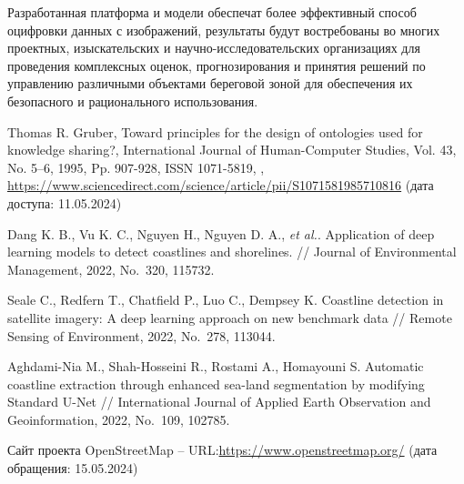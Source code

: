 \documentclass[732,14pt,final]{studrep}
\begin{document}
Разработанная платформа и модели обеспечат более эффективный способ оцифровки данных с изображений, результаты будут востребованы во многих проектных, изыскательских и научно-исследовательских организациях для проведения комплексных оценок, прогнозирования и принятия решений по управлению различными объектами береговой зоной для обеспечения их безопасного и рационального использования.


\begin{thebibliography}{99}
   Thomas R. Gruber,
Toward principles for the design of ontologies used for knowledge sharing?,
International Journal of Human-Computer Studies,
Vol. 43, No. 5–6,
1995,
Pp. 907-928,
ISSN 1071-5819,
, \url{https://www.sciencedirect.com/science/article/pii/S1071581985710816} (дата доступа: 11.05.2024)

 Dang K. B., Vu K. C., Nguyen H., Nguyen D. A., \emph{et al.}. Application of deep learning models to detect coastlines and shorelines. // Journal of Environmental Management, 2022, No.~320, 115732.

 Seale C., Redfern T., Chatfield P., Luo C., Dempsey K. Coastline detection in satellite imagery: A deep learning approach on new benchmark data // Remote Sensing of Environment, 2022, No.~278, 113044.

 Aghdami-Nia M., Shah-Hosseini R., Rostami A., Homayouni S. Automatic coastline extraction through enhanced sea-land segmentation by modifying Standard U-Net // International Journal of Applied Earth Observation and Geoinformation, 2022, No.~109, 102785.

 Сайт проекта OpenStreetMap -- URL:\url{https://www.openstreetmap.org/} (дата обращения: 15.05.2024)


\end{thebibliography}
\end{document}
